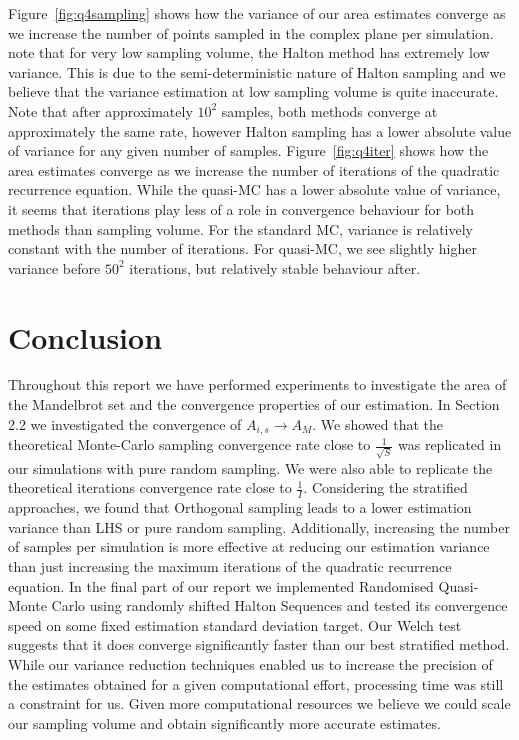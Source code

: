 \documentclass{article}
\begin{document}
    Figure~\ref{fig:q4sampling} shows how the variance of our area estimates converge as we increase the number of points sampled in the complex plane per simulation. note that for very low sampling volume, the Halton method has extremely low variance. This is due to the semi-deterministic nature of Halton sampling and we believe that the variance estimation at low sampling volume is quite inaccurate. Note that after approximately $10^2$ samples, both methods converge at approximately the same rate, however Halton sampling has a lower absolute value of variance for any given number of samples. Figure~\ref{fig:q4iter} shows how the area estimates converge as we increase the number of iterations of the quadratic recurrence equation. While the quasi-MC has a lower absolute value of variance, it seems that iterations play less of a role in convergence behaviour for both methods than sampling volume. For the standard MC, variance is relatively constant with the number of iterations. For quasi-MC, we see slightly higher variance before $50^2$ iterations, but relatively stable behaviour after.

    \section*{Conclusion}
    Throughout this report we have performed experiments to investigate the area of the Mandelbrot set and the convergence properties of our estimation. In Section 2.2 we investigated the convergence of $A_{i,s} \rightarrow A_{M}$. We showed that the theoretical Monte-Carlo sampling convergence rate close to $\frac{1}{\sqrt{S}}$ was replicated in our simulations with pure random sampling. We were also able to replicate the theoretical iterations convergence rate close to $\frac{1}{I}$. Considering the stratified approaches, we found that Orthogonal sampling leads to a lower estimation variance than LHS or pure random sampling. Additionally, increasing the number of samples per simulation is more effective at reducing our estimation variance than just increasing the maximum iterations of the quadratic recurrence equation. In the final part of our report we implemented Randomised Quasi-Monte Carlo using randomly shifted Halton Sequences and tested its convergence speed on some fixed estimation standard deviation target. Our Welch test suggests that it does converge significantly faster than our best stratified method. While our variance reduction techniques enabled us to increase the precision of the estimates obtained for a given computational effort, processing time was still a constraint for us. Given more computational resources we believe we could scale our sampling volume and obtain significantly more accurate estimates.
\end{document}
